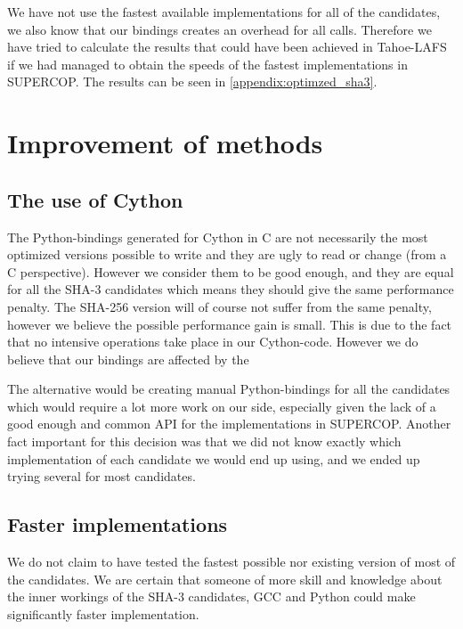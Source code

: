 \documentclass[english,12pt,a4paper]{book}
\begin{document}
We have not use the fastest available implementations for all of the
candidates, we also know that our bindings creates an overhead for all calls.
Therefore we have tried to calculate the results that could have been achieved
in Tahoe-\ac{LAFS} if we had managed to obtain the speeds of the fastest
implementations in \ac{SUPERCOP}. The results can be seen in
\autoref{appendix:optimzed_sha3}.

%
%
%

\section{Improvement of methods}

\subsection{The use of Cython}


The Python-bindings generated for Cython in C are not necessarily the most
optimized versions possible to write and they are ugly to read or change (from
a C perspective). However we consider them to be good enough, and they are
equal for all the \ac{SHA}-3 candidates which means they should give the same
performance penalty. The \ac{SHA}-256 version will of course not suffer from
the same penalty, however we believe the possible performance gain is small.
This is due to the fact that no intensive operations take place in our
Cython-code. However we do believe that our bindings are affected by the 

The alternative would be creating manual Python-bindings for all the candidates
which would require a lot more work on our side, especially given the lack of a
good enough and common \ac{API} for the implementations in \ac{SUPERCOP}.
Another fact important for this decision was that we did not know exactly which
implementation of each candidate we would end up using, and we ended up trying
several for most candidates.

\subsection{Faster implementations}
We do not claim to have tested the fastest possible nor existing version
of most of the candidates. We are certain that someone of more skill and
knowledge about the inner workings of the \ac{SHA}-3 candidates, \ac{GCC} and
Python could make significantly faster implementation.
\end{document}
